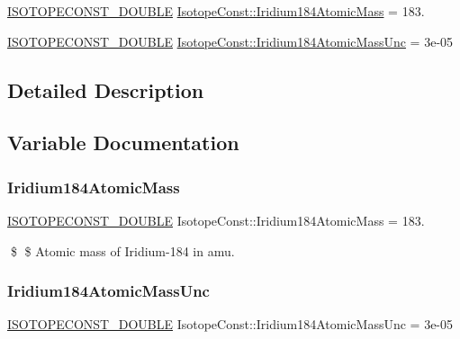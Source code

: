 \begin{DoxyCompactItemize}
\item 
\mbox{\hyperlink{group___isotope_const-_macros_ga8f45a7272ce02c0b4c65c44636ed719a}{I\+S\+O\+T\+O\+P\+E\+C\+O\+N\+S\+T\+\_\+\+D\+O\+U\+B\+LE}} \mbox{\hyperlink{group___isotope_const-_iridium-_ir184_ga695906f732d38877ba2b1ee2c0b81b08}{Isotope\+Const\+::\+Iridium184\+Atomic\+Mass}} = 183.
\item 
\mbox{\hyperlink{group___isotope_const-_macros_ga8f45a7272ce02c0b4c65c44636ed719a}{I\+S\+O\+T\+O\+P\+E\+C\+O\+N\+S\+T\+\_\+\+D\+O\+U\+B\+LE}} \mbox{\hyperlink{group___isotope_const-_iridium-_ir184_ga192ba589a8168beb88e9f6315897ca56}{Isotope\+Const\+::\+Iridium184\+Atomic\+Mass\+Unc}} = 3e-\/05
\end{DoxyCompactItemize}


\subsection{Detailed Description}


\subsection{Variable Documentation}
\mbox{\label{group___isotope_const-_iridium-_ir184_ga695906f732d38877ba2b1ee2c0b81b08}} 
\subsubsection{\texorpdfstring{Iridium184\+Atomic\+Mass}{Iridium184AtomicMass}}
{\footnotesize\ttfamily \mbox{\hyperlink{group___isotope_const-_macros_ga8f45a7272ce02c0b4c65c44636ed719a}{I\+S\+O\+T\+O\+P\+E\+C\+O\+N\+S\+T\+\_\+\+D\+O\+U\+B\+LE}} Isotope\+Const\+::\+Iridium184\+Atomic\+Mass = 183.}

\$ \$ Atomic mass of Iridium-\/184 in amu. \mbox{\label{group___isotope_const-_iridium-_ir184_ga192ba589a8168beb88e9f6315897ca56}} 
\subsubsection{\texorpdfstring{Iridium184\+Atomic\+Mass\+Unc}{Iridium184AtomicMassUnc}}
{\footnotesize\ttfamily \mbox{\hyperlink{group___isotope_const-_macros_ga8f45a7272ce02c0b4c65c44636ed719a}{I\+S\+O\+T\+O\+P\+E\+C\+O\+N\+S\+T\+\_\+\+D\+O\+U\+B\+LE}} Isotope\+Const\+::\+Iridium184\+Atomic\+Mass\+Unc = 3e-\/05}

